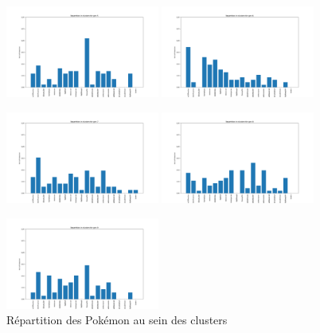 \documentclass[a4paper,12pt]{article}
\begin{document}
\begin{figure}[!h]
    \vspace{1em}  %

    \includegraphics[width=0.45\textwidth]{Clustering/number_poke_gen/gen5.png}
    \includegraphics[width=0.45\textwidth]{Clustering/number_poke_gen/gen6.png}
    

    \vspace{1em}  %

    \includegraphics[width=0.45\textwidth]{Clustering/number_poke_gen/gen7.png}
    \includegraphics[width=0.45\textwidth]{Clustering/number_poke_gen/gen8.png}
    

    \vspace{1em}  %

    \includegraphics[width=0.45\textwidth]{Clustering/number_poke_gen/gen9.png}
    \caption{Répartition des Pokémon au sein des clusters}
\end{figure}
\end{document}
